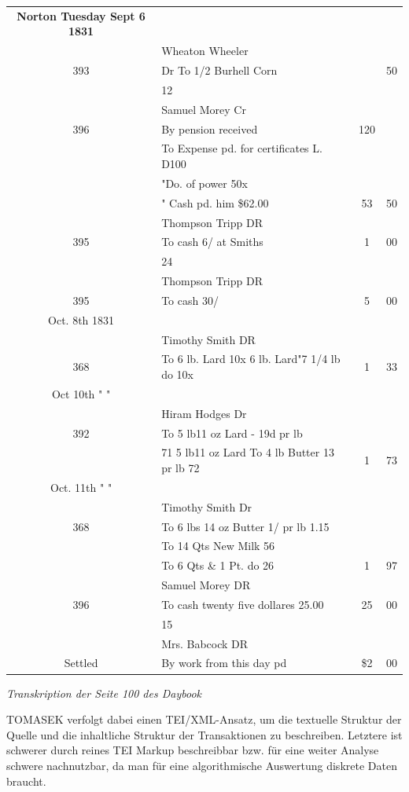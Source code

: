 \documentclass[12pt,a4paper]{article}
\begin{document}
\begin{tabular}{clcc}
 \textbf{Norton Tuesday Sept 6 1831}\\
    & Wheaton Wheeler & &\\
393 & Dr To 1/2 Burhell Corn & & 50 \\
    & 12 & &\\
    & Samuel Morey  Cr  & &\\
396 & By pension received & 120 & \\
    & To Expense pd. for certificates L. D100 & &\\
    & "Do. of power 50x & &\\
    & " Cash pd. him \$62.00 & 53 & 50\\
    & Thompson Tripp  DR  & &\\
395 & To cash 6/ at Smiths & 1 & 00\\	
    & 24 & &\\
    & Thompson Tripp  DR & &\\	
395 & To cash 30/ & 5  & 00\\		
Oct. 8th 1831\\
    & Timothy Smith DR & &\\
368 & To 6 lb. Lard 10x 6 lb. Lard"7 1/4 lb do 10x & 1 & 33 \\
Oct 10th " "\\
    & Hiram Hodges Dr & &\\
392 & To 5 lb11 oz Lard - 19d pr lb\\
    & 71 5 lb11 oz Lard To 4 lb Butter 13 pr lb 72 & 1 & 73\\
Oct. 11th " "\\
    & Timothy Smith  Dr& &\\
368 & To 6 lbs 14 oz Butter 1/ pr lb 1.15 & & \\ & To 14 Qts New Milk 56 & &\\
& To 6 Qts \& 1 Pt. do 26 & 1 & 97 	\\	
    & Samuel Morey DR & &\\
396 & To cash twenty five dollares 25.00 & 25 & 00\\
    & 15 & & \\	
    & Mrs. Babcock DR  & & \\		
Settled & By work from this day pd & \$2 & 00
\end{tabular}
\medskip
\begin{center}
\textit{Transkription der Seite 100 des \textit{Daybook}}
\end{center}
TOMASEK verfolgt dabei einen TEI/XML-Ansatz, um die textuelle Struktur der Quelle und die inhaltliche Struktur der Transaktionen zu beschreiben. Letztere ist schwerer durch reines TEI Markup beschreibbar bzw. für eine weiter Analyse schwere nachnutzbar, da man für eine algorithmische Auswertung diskrete Daten braucht.
\end{document}
